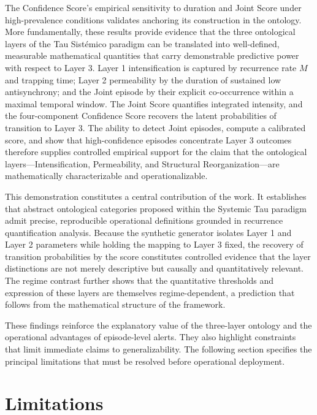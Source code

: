 \documentclass[11pt,a4paper]{article}
\begin{document}
The Confidence Score's empirical sensitivity to duration and Joint Score under high-prevalence conditions validates anchoring its construction in the ontology. More fundamentally, these results provide evidence that the three ontological layers of the Tau Sistémico paradigm can be translated into well-defined, measurable mathematical quantities that carry demonstrable predictive power with respect to Layer 3. Layer 1 intensification is captured by recurrence rate $M$ and trapping time; Layer 2 permeability by the duration of sustained low antisynchrony; and the Joint episode by their explicit co-occurrence within a maximal temporal window. The Joint Score quantifies integrated intensity, and the four-component Confidence Score recovers the latent probabilities of transition to Layer 3. The ability to detect Joint episodes, compute a calibrated score, and show that high-confidence episodes concentrate Layer 3 outcomes therefore supplies controlled empirical support for the claim that the ontological layers---Intensification, Permeability, and Structural Reorganization---are mathematically characterizable and operationalizable.

This demonstration constitutes a central contribution of the work. It establishes that abstract ontological categories proposed within the Systemic Tau paradigm admit precise, reproducible operational definitions grounded in recurrence quantification analysis. Because the synthetic generator isolates Layer 1 and Layer 2 parameters while holding the mapping to Layer 3 fixed, the recovery of transition probabilities by the score constitutes controlled evidence that the layer distinctions are not merely descriptive but causally and quantitatively relevant. The regime contrast further shows that the quantitative thresholds and expression of these layers are themselves regime-dependent, a prediction that follows from the mathematical structure of the framework.

These findings reinforce the explanatory value of the three-layer ontology and the operational advantages of episode-level alerts. They also highlight constraints that limit immediate claims to generalizability. The following section specifies the principal limitations that must be resolved before operational deployment.

\section{Limitations}
\end{document}
